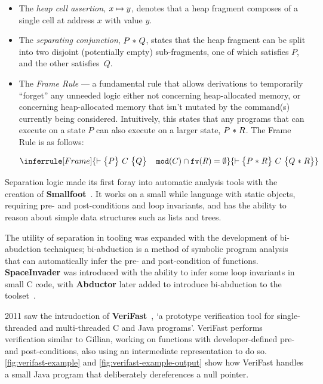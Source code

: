 \begin{itemize}
  \item The \textit{heap cell assertion}, $x \mapsto y$, denotes that a heap
  fragment composes of a single cell at address $x$ with value $y$.

  \item The \textit{separating conjunction}, $P \mathrel{*} Q$, states that the heap
  fragment can be split into two disjoint (potentially empty) sub-fragments,
  one of which satisfies $P$, and the other satisfies~$Q$.

  \item The \textit{Frame Rule} --- a fundamental rule that allows derivations
  to temporarily ``forget'' any unneeded logic either not concerning
  heap-allocated memory, or concerning heap-allocated memory that isn't mutated
  by the command(s) currently being considered. Intuitively, this states that
  any programs that can execute on a state $P$ can also execute on a larger
  state, $P \mathrel{*} R$. The Frame Rule is as follows:

  \[
    \inferrule[Frame]{
      \triple{P}{C}{Q} \quad \mathtt{mod}(C) \cap \mathtt{fv}(R) =  %
      \emptyset}{\triple{P \lstar R}{C}{Q \lstar R}
    }
  \]
\end{itemize}


Separation logic made its first foray into automatic analysis tools with the
creation of \textbf{Smallfoot}~\cite{smallfoot-paper, smallfoot-site}. It works
on a small while language with static objects, requiring pre- and
post-conditions and loop invariants, and has the ability to reason about simple
data structures such as lists and trees.

The utility of separation in tooling was expanded with the development of
bi-abudction techniques; bi-abduction is a method of symbolic program analysis
that can automatically infer the pre- and post-condition of functions.
\textbf{SpaceInvader} was introduced with the ability to infer some loop
invariants in small C code, with \textbf{Abductor} later added to introduce
bi-abduction to the toolset~\cite{abductor}.

2011 saw the intrudoction of \textbf{VeriFast}~\cite{verifast-paper,
  verifast-repo}, `a prototype verification tool for single-threaded and
multi-threaded C and Java programs'. VeriFast performs verification similar to
Gillian, working on functions with developer-defined pre- and post-conditions,
also using an intermediate representation to do so.
\autoref{fig:verifast-example} and \autoref{fig:verifast-example-output} show how
VeriFast handles a small Java program that deliberately dereferences a null
pointer.


